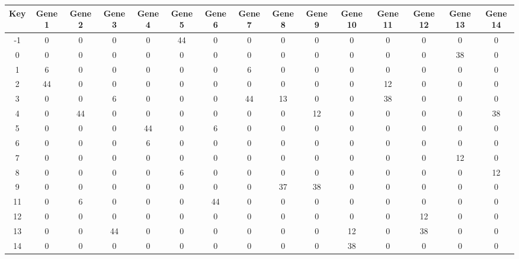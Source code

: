 \begin{tabular}{|c|c|c|c|c|c|c|c|c|c|c|c|c|c|c|}
\hline
Key & Gene 1 & Gene 2 & Gene 3 & Gene 4 & Gene 5 & Gene 6 & Gene 7 & Gene 8 & Gene 9 & Gene 10 & Gene 11 & Gene 12 & Gene 13 & Gene 14 \\
\hline
-1 & 0 & 0 & 0 & 0 & 44 & 0 & 0 & 0 & 0 & 0 & 0 & 0 & 0 & 0 \\
0 & 0 & 0 & 0 & 0 & 0 & 0 & 0 & 0 & 0 & 0 & 0 & 0 & 38 & 0 \\
1 & 6 & 0 & 0 & 0 & 0 & 0 & 6 & 0 & 0 & 0 & 0 & 0 & 0 & 0 \\
2 & 44 & 0 & 0 & 0 & 0 & 0 & 0 & 0 & 0 & 0 & 12 & 0 & 0 & 0 \\
3 & 0 & 0 & 6 & 0 & 0 & 0 & 44 & 13 & 0 & 0 & 38 & 0 & 0 & 0 \\
4 & 0 & 44 & 0 & 0 & 0 & 0 & 0 & 0 & 12 & 0 & 0 & 0 & 0 & 38 \\
5 & 0 & 0 & 0 & 44 & 0 & 6 & 0 & 0 & 0 & 0 & 0 & 0 & 0 & 0 \\
6 & 0 & 0 & 0 & 6 & 0 & 0 & 0 & 0 & 0 & 0 & 0 & 0 & 0 & 0 \\
7 & 0 & 0 & 0 & 0 & 0 & 0 & 0 & 0 & 0 & 0 & 0 & 0 & 12 & 0 \\
8 & 0 & 0 & 0 & 0 & 6 & 0 & 0 & 0 & 0 & 0 & 0 & 0 & 0 & 12 \\
9 & 0 & 0 & 0 & 0 & 0 & 0 & 0 & 37 & 38 & 0 & 0 & 0 & 0 & 0 \\
11 & 0 & 6 & 0 & 0 & 0 & 44 & 0 & 0 & 0 & 0 & 0 & 0 & 0 & 0 \\
12 & 0 & 0 & 0 & 0 & 0 & 0 & 0 & 0 & 0 & 0 & 0 & 12 & 0 & 0 \\
13 & 0 & 0 & 44 & 0 & 0 & 0 & 0 & 0 & 0 & 12 & 0 & 38 & 0 & 0 \\
14 & 0 & 0 & 0 & 0 & 0 & 0 & 0 & 0 & 0 & 38 & 0 & 0 & 0 & 0 \\
\hline
\end{tabular}